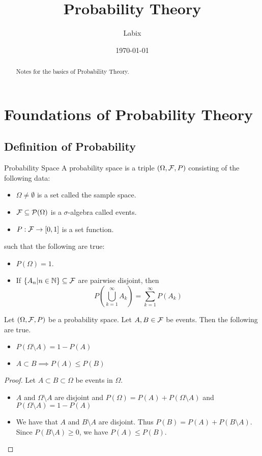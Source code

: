 \documentclass[a4paper]{article}
\title{Probability Theory}
\author{Labix}
\date{\today}
\begin{document}
\maketitle
\begin{abstract}
Notes for the basics of Probability Theory. 
\end{abstract}
\tableofcontents
\pagebreak

\section{Foundations of Probability Theory}
\subsection{Definition of Probability}
\begin{defn}{Probability Space}{} A probability space is a triple $(\Omega,\mathcal{F},P)$ consisting of the following data: 
\begin{itemize}
\item $\Omega\neq\emptyset$ is a set called the sample space. 
\item $\mathcal{F}\subseteq\mathcal{P}(\Omega)$ is a $\sigma$-algebra called events.  \item $P:\mathcal{F}\to[0,1]$ is a set function. 
\end{itemize}
such that the following are true: 
\begin{itemize}
\item $P(\Omega)=1$. 
\item If $\{A_n|n\in\mathbb{N}\}\subseteq\mathcal{F}$ are pairwise disjoint, then $$P\left(\bigcup_{k=1}^\infty A_k\right)=\sum_{k=1}^{\infty}P(A_k)$$
\end{itemize}
\end{defn}

\begin{prp}{}{} Let $(\Omega,\mathcal{F},P)$ be a probability space. Let $A,B\in\mathcal{F}$ be events. Then the following are true. 
\begin{itemize}
\item $P(\Omega\setminus A)=1-P(A)$
\item $A\subset B\implies P(A)\leq P(B)$
\end{itemize} \tcbline
\begin{proof} Let $A\subset B\subset\Omega$ be events in $\Omega$. 
\begin{itemize}
\item $A$ and $\Omega\setminus A$ are disjoint and $P(\Omega)=P(A)+P(\Omega\setminus A)$ and $P(\Omega\setminus A)=1-P(A)$
\item We have that $A$ and $B\setminus A$ are disjoint. Thus $P(B)=P(A)+P(B\setminus A)$. Since $P(B\setminus A)\geq 0$, we have $P(A)\leq P(B)$.  
\end{itemize}
\end{proof}
\end{prp}
\end{document}
